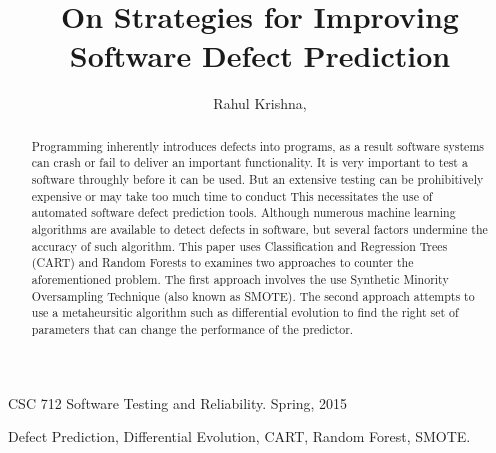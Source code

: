 \documentclass[12pt]{IEEEtran}
\begin{document}
  {CSC 712 Software Testing and Reliability. Spring, 
    2015}
  
  \title{On Strategies for Improving Software Defect Prediction}
  \author{Rahul Krishna, 
    }
 \maketitle 
    \begin{abstract}
      Programming inherently introduces defects into programs, as a result software systems can crash or fail to deliver an important functionality. It is very important to test a software throughly before it can be used. But an extensive testing can be prohibitively expensive or may take too much time to conduct This necessitates the use of automated software defect prediction tools. Although numerous machine learning algorithms are available to detect defects in software, but several factors undermine the accuracy of such algorithm. This paper uses Classification and Regression Trees (CART) and Random Forests to examines two approaches to counter the aforementioned problem. The first approach involves the use Synthetic Minority Oversampling Technique (also known as SMOTE). The second approach attempts to use a metaheursitic algorithm such as differential evolution to find the right set of parameters that can change the performance of the predictor. 
    \end{abstract}
    
    \begin{IEEEkeywords}
      Defect Prediction, Differential Evolution, CART, Random Forest, SMOTE.
    \end{IEEEkeywords}
\end{document}
